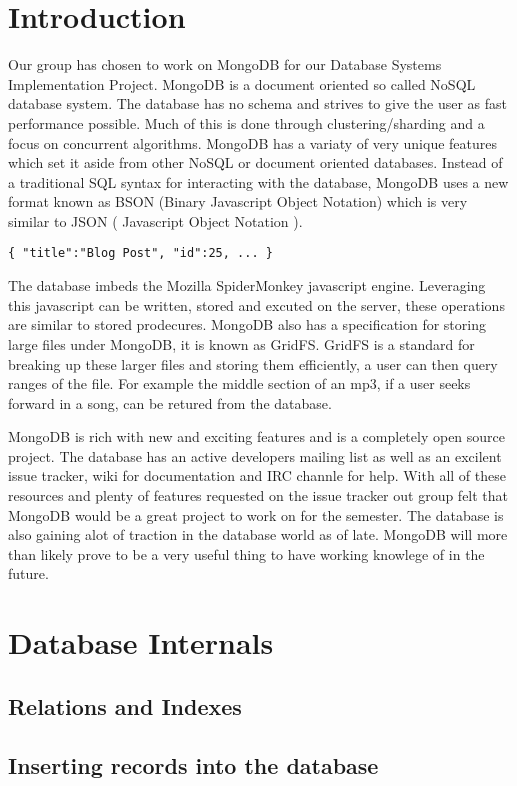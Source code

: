 \documentclass{dependencies/acm_proc_article-sp}
\begin{document}
\section{Introduction}
Our group has chosen to work on MongoDB for our Database Systems
Implementation Project. MongoDB is a document oriented so called NoSQL
database system. The database has no schema and strives to give the user as fast performance possible.
Much of this is done through clustering/sharding and a focus on concurrent algorithms.
MongoDB has a variaty of very unique features which set it aside from other NoSQL or document oriented databases.
Instead of a traditional SQL syntax for interacting with the database, MongoDB uses
a new format known as BSON (Binary Javascript Object Notation) which is very similar
to JSON ( Javascript Object Notation ).\begin{lstlisting}
{ "title":"Blog Post", "id":25, ... }
\end{lstlisting}The database imbeds the Mozilla SpiderMonkey javascript engine.
Leveraging this javascript can be written, stored and excuted on the server, these
operations are similar to stored prodecures. MongoDB also has a specification for storing
large files under MongoDB, it is known as GridFS. GridFS is a standard for breaking up these larger
files and storing them efficiently, a user can then query ranges of the file. For example the middle section
of an mp3, if a user seeks forward in a song, can be retured from the database.

MongoDB is rich with new and exciting features and is a completely open source project.
The database has an active developers mailing list as well as an excilent issue tracker,
wiki for documentation and IRC channle for help. With all of these resources and plenty
of features requested on the issue tracker out group felt that MongoDB would be a great
project to work on for the semester. The database is also gaining alot of traction in the
database world as of late. MongoDB will more than likely prove to be a very useful thing
to have working knowlege of in the future.

\section{Database Internals}
\subsection{Relations and Indexes}
\subsection{Inserting records into the database}
\end{document}
